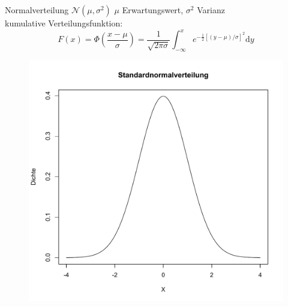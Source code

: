 \documentclass{beamer}
\begin{document}
\begin{frame}{\insertsection}
\begin{block}{Normalverteilung $\mathcal{N}(\mu,\sigma^2)$}
	$\mu$ Erwartungswert, $\sigma^2$ Varianz \\
	kumulative Verteilungsfunktion:
	\begin{equation*}
	F(x) = \Phi\left(\frac{x - \mu}{\sigma}\right) = \frac{1}{\sqrt{2\pi\sigma}} \int_{-\infty}^{x}e^{-\frac{1}{2}[(y-\mu)/\sigma]^2}\textrm{d}y
	\end{equation*}
\end{block}
\end{frame}

\begin{frame}{\insertsection}
	\begin{figure}[htbp]
		\centering
		\includegraphics[height=0.99\textheight]{figures/standardnorm_empty}
	\end{figure}
\end{frame}
\end{document}
